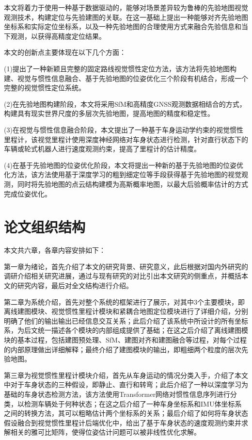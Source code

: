 本文将着力于使用一种基于数据驱动的，能够对场景差异较为鲁棒的先验地图视觉观测技术，构建定位与先验建图的关联。在这一基础上提出一种能够对齐先验地图坐标系和实际定位坐标系，以及一种先验地图的合理使用方式来融合先验信息和当下观测，以获得高精度定位结果。

本文的创新点主要体现在以下几个方面：

(1)提出了一种新颖且完整的固定路线视觉惯性定位方法，该方法将先验地图构建、视觉与惯性信息融合、基于先验地图的位姿优化三个阶段有机结合，形成一个完整的视觉惯性定位系统。

(2)在先验地图构建阶段，本文将采用SfM和高精度GNSS观测数据相结合的方式，构建具有现实世界尺度的多层次先验地图，提高地图的精度和稳定性。

(3)在视觉与惯性信息融合阶段，本文提出了一种基于车身运动学约束的视觉惯性里程计，该视觉里程计使用深度神经网络对车身状态进行检测，针对直行状态下的车辆或轮式机器人进行速度观测约束，提高了里程计的估计精度。

(4)在基于先验地图的位姿优化阶段，本文将提出一种新的基于先验地图的位姿优化方法，该方法使用基于深度学习的粗到细定位等手段获得基于先验地图的视觉观测，同时将先验地图的点云结构建模为高斯概率地图，以最大后验概率估计的方式完成位姿优化。

\section{论文组织结构}
本文共六章，各章内容安排如下：

第一章为绪论，首先介绍了本文的研究背景、研究意义，此后根据对国内外研究的调研介绍相关研究进展，通过与现有研究的对比引出本文研究的侧重点，并概括本文的研究内容，最后对全文结构进行介绍。

第二章为系统介绍，首先对整个系统的框架进行了展示，对其中3个主要模块，即离线建图模块、视觉惯性里程计模块和紧耦合地图定位模块进行了详细介绍，分别明确了他们的输出输出已经信息交互关系；此后介绍了该系统中所设计的所有坐标系，为后文统一描述各个模块的内部组成提供了基础；在这之后介绍了离线建图模块的基本过程，包括建图预处理、SfM、建图对齐和建图融合等过程，对每个过程的内部原理做出详细解释；最终介绍了建图模块的输出，即粗细两个粒度的层次先验地图。

第三章为视觉惯性里程计模块介绍，首先从车身运动的情况分类入手，介绍了本文中对于车身状态的三种假设，即静止、直行和转弯；此后介绍了一种以深度学习为基础的车身状态检测方法，该方法使用Transformer网络对惯性信息序列进行分类，以检测车辆处于何种状态；在这之后介绍了一种车身坐标系和IMU体坐标系之间的转换方法，其可以粗略估计两个坐标系的关系；最后介绍了如何将车身状态假设融合到视觉惯性里程计后端优化中，给出了基于车身状态的速度观测约束并求解相关的雅可比矩阵，使得位姿估计问题可以被非线性优化求解。

